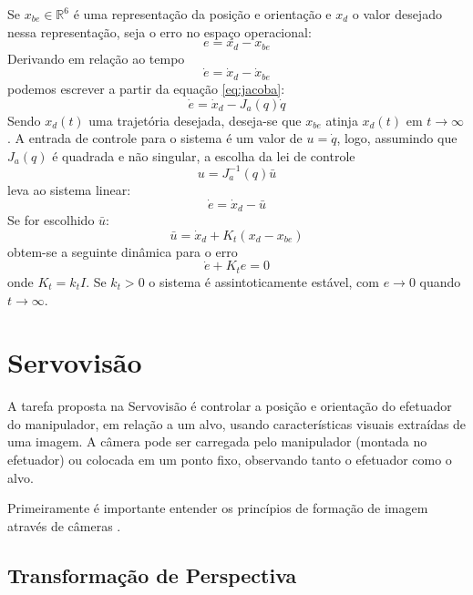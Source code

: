 Se ${x_{be}} \in \mathbb{R}^6$ é uma representação da posição e orientação e ${x}_d$ o valor desejado nessa representação, seja o erro no espaço operacional:
\begin{equation}
{e} = {x}_d - {x}_{be}
\end{equation}
Derivando em relação ao tempo
\begin{equation}
{\dot{e}} = {\dot{x}}_d - {\dot{x}_{be}}
\end{equation}
podemos escrever a partir da equação \ref{eq:jacoba}:
\begin{equation}
{\dot{e}} = {\dot{x}}_d - {J}_a({q})\dot{{q}}
\end{equation}
Sendo ${x}_d(t)$ uma trajetória desejada, deseja-se que ${x}_{be}$ atinja ${x}_d(t)$ em $t \to \infty$ .
A entrada de controle para o sistema é um valor de ${u} = \dot{{q}}$, logo, assumindo que ${J}_a({q})$ é quadrada e não singular, a escolha da lei de controle
\begin{equation}
{u} = {J}_a^{-1}({q})\bar{{u}}
\end{equation}
leva ao sistema linear:
\begin{equation}
\dot{{e}} = \dot{{x}}_d - \bar{{u}}
\end{equation}
Se for escolhido $\bar{{u}}$:
\begin{equation}
\bar{{u}} = \dot{{x}}_d + {K_t} ({x}_d - {x}_{be})
\end{equation}
obtem-se a seguinte dinâmica para o erro
\begin{equation}
\dot{{e}} + {K_t} {e} = 0
\end{equation}
onde $K_t = k_t I$. Se $k_t > 0$ o sistema é assintoticamente estável, com $e \rightarrow 0$ quando $t \to \infty$.

\section{Servovisão}
A tarefa proposta na Servovisão é controlar a posição e orientação do efetuador do manipulador, em relação a um alvo, usando características visuais extraídas de uma imagem. A câmera pode ser carregada pelo manipulador (montada no efetuador) ou colocada em um ponto fixo, observando tanto o efetuador como o alvo.

Primeiramente é importante entender os princípios de formação de imagem através de câmeras \citep{petercorke}. 

\subsection{Transformação de Perspectiva} \label{sec:camera_model}

